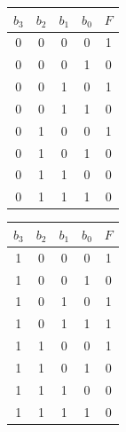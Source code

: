 \begin{tabular}{|c|c|c|c|c|}
\hline
$b_3$ & $b_2$ & $b_1$ & $b_0$ & $F$ \\ \hline
0 & 0 & 0 & 0 & 1 \\
0 & 0 & 0 & 1 & 0 \\
0 & 0 & 1 & 0 & 1 \\
0 & 0 & 1 & 1 & 0 \\
0 & 1 & 0 & 0 & 1 \\
0 & 1 & 0 & 1 & 0 \\
0 & 1 & 1 & 0 & 0 \\
0 & 1 & 1 & 1 & 0 \\ \hline
\end{tabular}
\quad
\begin{tabular}{|c|c|c|c|c|}
\hline
$b_3$ & $b_2$ & $b_1$ & $b_0$ & $F$ \\ \hline
1 & 0 & 0 & 0 & 1 \\
1 & 0 & 0 & 1 & 0 \\
1 & 0 & 1 & 0 & 1 \\
1 & 0 & 1 & 1 & 1 \\
1 & 1 & 0 & 0 & 1 \\
1 & 1 & 0 & 1 & 0 \\
1 & 1 & 1 & 0 & 0 \\
1 & 1 & 1 & 1 & 0 \\ \hline
\end{tabular}
